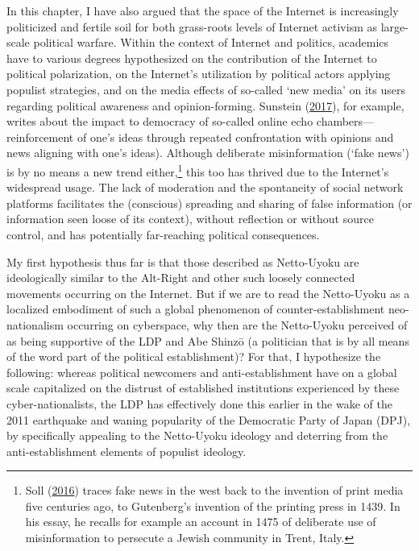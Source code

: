 \documentclass[10pt,british,A4paper,,openany]{memoir}
\begin{document}
In this chapter, I have also argued that the space of the Internet is
increasingly politicized and fertile soil for both grass-roots levels of
Internet activism as large-scale political warfare. Within the context
of Internet and politics, academics have to various degrees hypothesized
on the contribution of the Internet to political polarization, on the
Internet's utilization by political actors applying populist strategies,
and on the media effects of so-called `new media' on its users regarding
political awareness and opinion-forming. Sunstein
(\protect\hyperlink{ref-sunstein_republic:_2017}{2017}), for example,
writes about the impact to democracy of so-called online echo
chambers---reinforcement of one's ideas through repeated confrontation
with opinions and news aligning with one's ideas). Although deliberate
misinformation (`fake news') is by no means a new trend
either,\footnote{Soll (\protect\hyperlink{ref-soll_long_2016}{2016})
  traces fake news in the west back to the invention of print media five
  centuries ago, to Gutenberg's invention of the printing press in 1439.
  In his essay, he recalls for example an account in 1475 of deliberate
  use of misinformation to persecute a Jewish community in Trent, Italy.}
this too has thrived due to the Internet's widespread usage. The lack of
moderation and the spontaneity of social network platforms facilitates
the (conscious) spreading and sharing of false information (or
information seen loose of its context), without reflection or without
source control, and has potentially far-reaching political consequences.

My first hypothesis thus far is that those described as Netto-Uyoku are
ideologically similar to the Alt-Right and other such loosely connected
movements occurring on the Internet. But if we are to read the
Netto-Uyoku as a localized embodiment of such a global phenomenon of
counter-establishment neo-nationalism occurring on cyberspace, why then
are the Netto-Uyoku perceived of as being supportive of the LDP and Abe
Shinzō (a politician that is by all means of the word part of the
political establishment)? For that, I hypothesize the following: whereas
political newcomers and anti-establishment have on a global scale
capitalized on the distrust of established institutions experienced by
these cyber-nationalists, the LDP has effectively done this earlier in
the wake of the 2011 earthquake and waning popularity of the Democratic
Party of Japan (DPJ), by specifically appealing to the Netto-Uyoku
ideology and deterring from the anti-establishment elements of populist
ideology.
\end{document}
